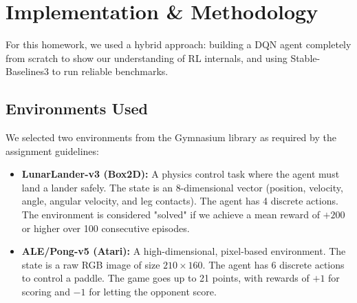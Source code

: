 \documentclass[12pt]{article}
\begin{document}
\section{Implementation \& Methodology}
\label{sec:methods}

For this homework, we used a hybrid approach: building a DQN agent completely from scratch to show our understanding of RL internals, and using Stable-Baselines3 to run reliable benchmarks.

\subsection{Environments Used}
We selected two environments from the Gymnasium library \citep{towers2024gymnasium} as required by the assignment guidelines:
\begin{itemize}
  \item \textbf{LunarLander-v3 (Box2D):} A physics control task where the agent must land a lander safely. The state is an 8-dimensional vector (position, velocity, angle, angular velocity, and leg contacts). The agent has 4 discrete actions. The environment is considered "solved" if we achieve a mean reward of $+200$ or higher over 100 consecutive episodes.
  \item \textbf{ALE/Pong-v5 (Atari):} A high-dimensional, pixel-based environment. The state is a raw RGB image of size $210 \times 160$. The agent has 6 discrete actions to control a paddle. The game goes up to 21 points, with rewards of $+1$ for scoring and $-1$ for letting the opponent score.
\end{itemize}
\end{document}
